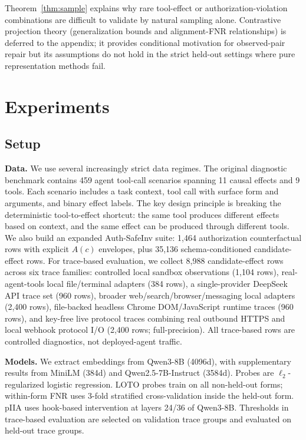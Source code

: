 \documentclass{article}
\begin{document}
Theorem~\ref{thm:sample} explains why rare tool-effect or authorization-violation combinations are difficult to validate by natural sampling alone. Contrastive projection theory (generalization bounds and alignment-FNR relationships) is deferred to the appendix; it provides conditional motivation for observed-pair repair but its assumptions do not hold in the strict held-out settings where pure representation methods fail.

\section{Experiments}

\subsection{Setup}

\textbf{Data.} We use several increasingly strict data regimes. The original diagnostic benchmark contains 459 agent tool-call scenarios spanning 11 causal effects and 9 tools. Each scenario includes a task context, tool call with surface form and arguments, and binary effect labels. The key design principle is breaking the deterministic tool-to-effect shortcut: the same tool produces different effects based on context, and the same effect can be produced through different tools. We also build an expanded Auth-SafeInv suite: 1,464 authorization counterfactual rows with explicit $A(c)$ envelopes, plus 35,136 schema-conditioned candidate-effect rows. For trace-based evaluation, we collect 8,988 candidate-effect rows across six trace families: controlled local sandbox observations (1,104 rows), real-agent-tools local file/terminal adapters (384 rows), a single-provider DeepSeek API trace set (960 rows), broader web/search/browser/messaging local adapters (2,400 rows), file-backed headless Chrome DOM/JavaScript runtime traces (960 rows), and key-free live protocol traces combining real outbound HTTPS and local webhook protocol I/O (2,400 rows; full-precision). All trace-based rows are controlled diagnostics, not deployed-agent traffic.

\textbf{Models.} We extract embeddings from Qwen3-8B (4096d), with supplementary results from MiniLM (384d) and Qwen2.5-7B-Instruct (3584d). Probes are $\ell_2$-regularized logistic regression. LOTO probes train on all non-held-out forms; within-form FNR uses 3-fold stratified cross-validation inside the held-out form. pIIA uses hook-based intervention at layers 24/36 of Qwen3-8B. Thresholds in trace-based evaluation are selected on validation trace groups and evaluated on held-out trace groups.
\end{document}
